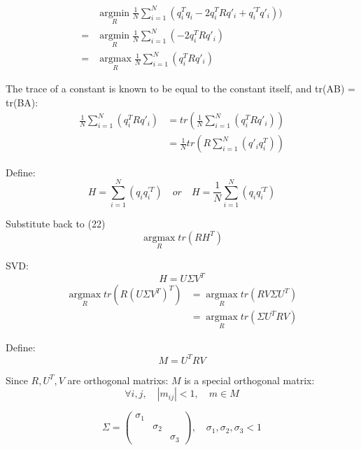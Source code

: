 \documentclass{article}
\begin{document}
\begin{align}
    &\mathop{\arg\min}\limits_{R}\frac{1}{N}\sum^{N}_{i=1}(q_i^Tq_i - 2q_i^TRq'_i + q_i^{\prime T}q'_i))\\
    =&\mathop{\arg\min}\limits_{R}\frac{1}{N}\sum^{N}_{i=1}(- 2q_i^TRq'_i)\\
    =&\mathop{\arg\max}\limits_{R}\frac{1}{N}\sum^{N}_{i=1}(q_i^TRq'_i)
\end{align}
\par
The trace of a constant is known to be equal to the constant itself, and tr(AB) = tr(BA):
\begin{align}
\frac{1}{N}\sum^{N}_{i=1}(q_i^TRq'_i)&=tr(\frac{1}{N}\sum^{N}_{i=1}(q_i^TRq'_i))\\
&=\frac{1}{N}tr(R\sum^{N}_{i=1}(q'_iq_i^T))
\end{align}
\par
Define:
\begin{equation}
    H = \sum^{N}_{i=1}(q_iq_i^{\prime T})\quad or \quad H = \frac{1}{N}\sum^{N}_{i=1}(q_iq_i^{\prime T})
\end{equation}
\par
Substitute back to (22)
\begin{equation}
    \mathop{\arg\max}\limits_{R}tr(RH^T)
\end{equation}
\par
SVD:
\begin{equation}
    H = U\Sigma V^T
\end{equation}
\begin{align}
\mathop{\arg\max}\limits_{R}tr(R(U\Sigma V^T)^T)&=\mathop{\arg\max}\limits_{R}tr(RV\Sigma U^T)\\
&=\mathop{\arg\max}\limits_{R}tr(\Sigma U^TRV)
\end{align}
\par
Define:
\begin{equation}
M=U^TRV
\end{equation}
\par
Since $R, U^T, V$ are orthogonal matrixs: $M$ is a special orthogonal matrix:
\begin{equation}
    \forall i,j, \quad |m_{ij}|<1, \quad  m \in M
\end{equation}

\begin{equation}
    \Sigma=
\begin{pmatrix}
    \sigma_1 &  & \\
     & \sigma_2 & \\
    &  & \sigma_3
\end{pmatrix}
,\quad \sigma_1, \sigma_2, \sigma_3 < 1
\end{equation}
\end{document}
